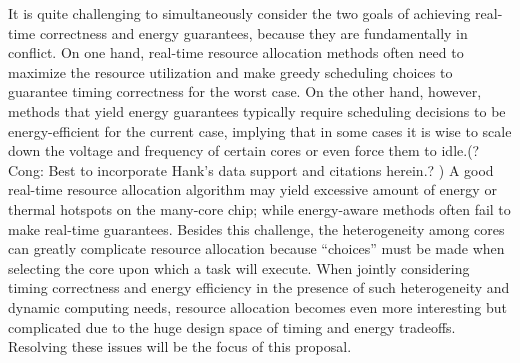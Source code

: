 It is quite challenging to simultaneously consider the two goals of achieving real-time correctness and energy guarantees, because they are fundamentally in conflict. 
On one hand, real-time resource allocation methods often need to maximize the resource utilization and make greedy scheduling choices to guarantee timing correctness for the worst case. On the other hand, however, methods that yield energy guarantees typically require scheduling decisions to be energy-efficient for the current case, implying that in some cases it is wise to scale down the voltage and frequency of certain cores or even force them to idle.(?Cong: Best to incorporate Hank's data support and citations herein.? ) 
 A good real-time resource allocation algorithm may yield excessive amount of energy or thermal hotspots on the many-core chip; while energy-aware methods often fail to make real-time guarantees. %
  Besides this challenge, the heterogeneity among cores can greatly complicate resource allocation because ``choices'' must be made when selecting the core upon which a task will execute. When jointly considering timing correctness and energy efficiency in the presence of such heterogeneity and dynamic computing needs, resource allocation becomes even more interesting but complicated due to the huge design space of  timing and energy tradeoffs. Resolving these issues will be the focus of this proposal.



